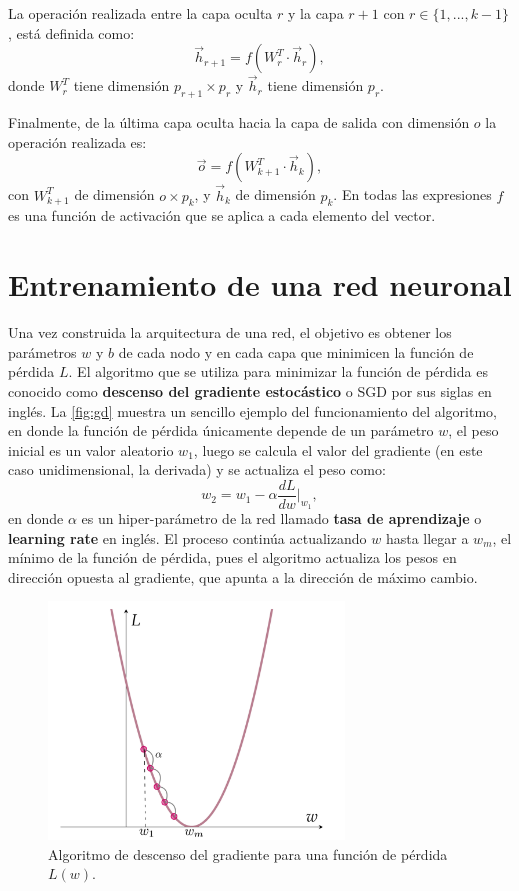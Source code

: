 \noindent La operación realizada entre la capa oculta $r$ y la capa $r+1$ con $r \in \{1,...,k-1\}$, está definida como:
$$\vec{h}_{r+1} = f(W^T_{r} \cdot \vec{h}_r),$$
donde $W^T_{r}$ tiene dimensión $p_{r+1} \times p_r$ y $\vec{h}_r$ tiene dimensión $p_r$.

\noindent Finalmente, de la última capa oculta hacia la capa de salida con dimensión $o$ la operación realizada es:
$$\vec{o} = f(W^T_{k+1} \cdot \vec{h}_k),$$
con $W^T_{k+1}$ de dimensión $o \times p_{k}$, y $\vec{h}_k$ de dimensión $p_k$. En todas las expresiones $f$ es una función de activación que se aplica a cada elemento del vector.

\section{Entrenamiento de una red neuronal}\label{sec:TrainNN}
Una vez construida la arquitectura de una red, el objetivo es obtener los parámetros $w$ y $b$ de cada nodo y en cada capa que minimicen la función de pérdida $L$. El algoritmo que se utiliza para minimizar la función de pérdida es conocido como \textbf{descenso del gradiente estocástico} \cite{Robbins1951ASA} o SGD por sus siglas en inglés. La \autoref{fig:gd} muestra un sencillo ejemplo del funcionamiento del algoritmo, en donde la función de pérdida únicamente depende de un parámetro $w$, el peso inicial es un valor aleatorio $w_1$, luego se calcula el valor del gradiente (en este caso unidimensional, la derivada) y se actualiza el peso como:
$$w_2 = w_1 - \alpha \frac{dL}{dw}\bigg|_{w_1},$$
en donde $\alpha$ es un hiper-parámetro de la red llamado \textbf{tasa de aprendizaje} o \textbf{learning rate} en inglés. El proceso continúa actualizando $w$ hasta llegar a $w_m$, el mínimo de la función de pérdida, pues el algoritmo actualiza los pesos en dirección opuesta al gradiente, que apunta a la dirección de máximo cambio.

\begin{figure}[h]
  \centering
  \includegraphics[width=0.7\textwidth]{./img/GD.png}
\caption{Algoritmo de descenso del gradiente para una función de pérdida $L(w)$.}
\label{fig:gd}
\end{figure}

